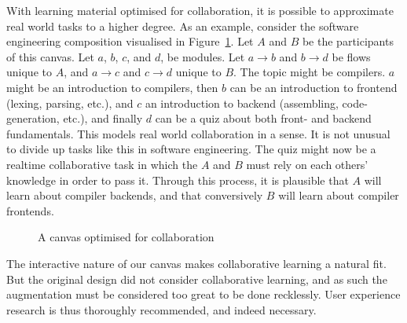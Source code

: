 With learning material optimised for collaboration, it is possible to 
approximate real world tasks to a higher degree. As an example, consider the 
software engineering composition visualised in Figure~\ref{collabcanvas}. Let 
$A$ and $B$ be the participants of this canvas. Let $a$, $b$, $c$, and $d$, be 
modules. Let $a \to b$ and $b \to d$ be flows unique to $A$, and $a \to c$ and 
$c \to d$ unique to $B$. The topic might be compilers. $a$ might be an 
introduction to compilers, then $b$ can be an introduction to frontend 
(lexing, parsing, etc.), and $c$ an introduction to backend (assembling, 
code-generation, etc.), and finally $d$ can be a quiz about both front- and 
backend fundamentals. This models real world collaboration in a sense. It is 
not unusual to divide up tasks like this in software engineering. The quiz 
might now be a realtime collaborative task in which the $A$ and $B$ must rely 
on each others' knowledge in order to pass it. Through this process, it is 
plausible that $A$ will learn about compiler backends, and that conversively 
$B$ will learn about compiler frontends.

\begin{figure}[H]
\begin{centering}
\caption{A canvas optimised for collaboration}
\label{collabcanvas}
\end{centering}
\end{figure}

The interactive nature of our canvas makes collaborative learning a natural 
fit. But the original design did not consider collaborative learning, and as 
such the augmentation must be considered too great to be done recklessly. User 
experience research is thus thoroughly recommended, and indeed necessary.
